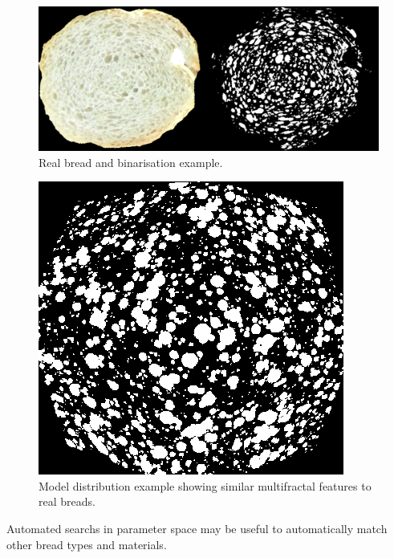 \documentclass[final,5p,times]{elsarticle}
\begin{document}
{\begin{figure}[!ht]
\includegraphics[scale=0.2]{realbin.png}
\caption{ Real bread and binarisation example.}
\label{realbin}
\end{figure}

\begin{figure}[!ht]
\includegraphics[scale=0.2]{bestwarp.png}
\caption{Model distribution example showing similar multifractal features to real breads.}
\label{bestwarp}
\end{figure}


Automated searchs in parameter space may be useful to automatically match other bread types and materials.



}
\end{document}
